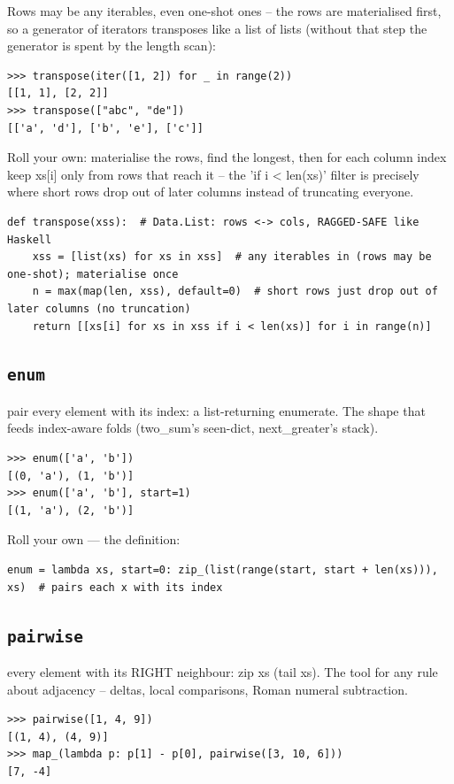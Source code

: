 \documentclass[10pt,letterpaper]{book}
\begin{document}
Rows may be any iterables, even one-shot ones -- the rows are materialised first, so a generator of iterators transposes like a list of lists (without that step the generator is spent by the length scan):

\begin{lstlisting}[style=ex]
>>> transpose(iter([1, 2]) for _ in range(2))
[[1, 1], [2, 2]]
>>> transpose(["abc", "de"])
[['a', 'd'], ['b', 'e'], ['c']]
\end{lstlisting}

Roll your own: materialise the rows, find the longest, then for each column index keep xs[i] only from rows that reach it -- the 'if i < len(xs)' filter is precisely where short rows drop out of later columns instead of truncating everyone.

\begin{lstlisting}[style=ex]
def transpose(xss):  # Data.List: rows <-> cols, RAGGED-SAFE like Haskell
    xss = [list(xs) for xs in xss]  # any iterables in (rows may be one-shot); materialise once
    n = max(map(len, xss), default=0)  # short rows just drop out of later columns (no truncation)
    return [[xs[i] for xs in xss if i < len(xs)] for i in range(n)]
\end{lstlisting}
\subsection{\texttt{enum}}\label{def:enum}
pair every element with its index: a list-returning enumerate. The shape that feeds index-aware folds (two\_sum's seen-dict, next\_greater's stack).
\begin{lstlisting}[style=ex]
>>> enum(['a', 'b'])
[(0, 'a'), (1, 'b')]
>>> enum(['a', 'b'], start=1)
[(1, 'a'), (2, 'b')]
\end{lstlisting}

Roll your own --- the definition:

\begin{lstlisting}[style=ex]
enum = lambda xs, start=0: zip_(list(range(start, start + len(xs))), xs)  # pairs each x with its index
\end{lstlisting}
\subsection{\texttt{pairwise}}\label{def:pairwise}
every element with its RIGHT neighbour: zip xs (tail xs). The tool for any rule about adjacency -- deltas, local comparisons, Roman numeral subtraction.
\begin{lstlisting}[style=ex]
>>> pairwise([1, 4, 9])
[(1, 4), (4, 9)]
>>> map_(lambda p: p[1] - p[0], pairwise([3, 10, 6]))
[7, -4]
\end{lstlisting}
\end{document}
